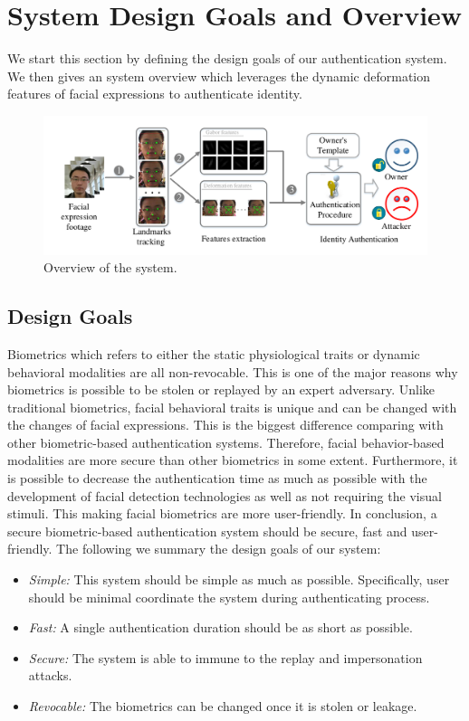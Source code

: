 \section{System Design Goals and Overview}
    We start this section by defining the design goals of our authentication system. We then gives an system overview which leverages the dynamic deformation features of facial expressions to authenticate identity.
    \begin{figure}[!ht]
        \centering
        \includegraphics[width=\textwidth]{fig/overview.pdf}
        \caption{Overview of the system.}
        \label{fig:overview}
    \end{figure}
    \subsection{Design Goals}
        Biometrics which refers to either the static physiological traits or dynamic behavioral modalities are all non-revocable. This is one of the major reasons why biometrics is possible to be stolen or replayed by an expert adversary. Unlike traditional biometrics, facial behavioral traits is unique and can be changed with the changes of facial expressions. This is the biggest difference comparing with other biometric-based authentication systems. Therefore, facial behavior-based modalities are more secure than other biometrics in some extent.  Furthermore, it is possible to decrease the authentication time as much as possible with the development of facial detection technologies as well as not requiring the visual stimuli. This making facial biometrics are more user-friendly. In conclusion, a secure biometric-based authentication system should be secure, fast and user-friendly. The following we summary the design goals of our system:
        \begin{itemize}
            \item \emph{Simple:} This system should be simple as much as possible. Specifically, user should be minimal coordinate the system during authenticating process.
            \item \emph{Fast:} A single authentication duration should be as short as possible.
            \item \emph{Secure:} The system is able to immune to the replay and impersonation attacks.
            \item \emph{Revocable:} The biometrics can be changed once it is stolen or leakage.
        \end{itemize}

